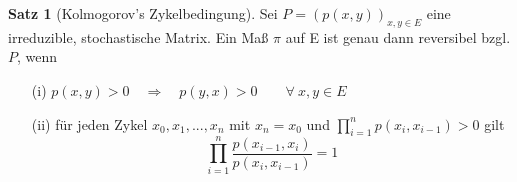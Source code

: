 \documentclass[a4paper,12pt]{scrartcl}
\theoremstyle{definition}
\newtheorem{sat}{Satz}[section]
\begin{document}
\begin{sat}[Kolmogorov's Zykelbedingung]
\label{Kolmogorov's Zykelbedingung}
Sei $P = (p(x,y))_{x,y \in E}$ eine irreduzible, stochastische Matrix. Ein Maß $\pi$ auf E ist genau dann reversibel bzgl. $P$, wenn
\begin{itemize}
\item[(i)] $p(x,y)>0 \quad \Rightarrow \quad p(y,x)>0 \qquad \forall \: x,y \in E$ 
\item[(ii)] für jeden Zykel $x_{0},x_{1},...,x_{n}$ mit $x_{n} = x_{0}$ und $\prod_{i=1}^{n} p(x_{i},x_{i-1})>0$ gilt
\begin{equation*}
\prod_{i=1}^{n} \dfrac{p(x_{i-1},x_{i})}{p(x_{i},x_{i-1})} = 1
\end{equation*} 
\end{itemize}
\end{sat}
\end{document}
